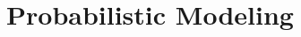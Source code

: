 \documentclass[letterpaper]{article} %
\begin{document}




%
%

%












%
%

%






\section{Probabilistic Modeling}
%
%
\end{document}
